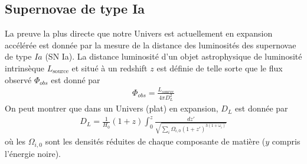 \documentclass[a4paper,12pt]{report}
\theoremstyle{plain}
\theoremstyle{plain}
\begin{document}
% 

\subsection{Supernovae de type Ia}
La preuve la plus directe que notre Univers est actuellement en expansion acc\'el\'er\'ee
est donn\'ee par la mesure de la distance des luminosit\'es des supernovae de type $Ia$ (SN Ia). La
distance luminosit\'e d'un objet astrophysique de luminosit\'e intrins\`eque $L_{\text{source}}$ et situ\'e \`a
un redshift $z$ est d\'efinie de telle sorte que le flux observ\'e $ \Phi_{obs}$ est donn\'e par
\begin{eqnarray}
 \Phi_{obs} = \frac{L_{source}}{ 4 \pi D_L^2} \label{gene28}
\end{eqnarray}
On peut montrer \cite{267} que dans un Univers (plat) en expansion, $D_L$ est donn\'ee par
\begin{eqnarray}
 D_L = \frac{1}{H_0} (1 + z) \int_0^z \frac{dz'}{\sqrt{ \sum_{i}  \Omega_{i,0}(1+z')^{3(1 + \omega_i) }}} \label{gene29}
\end{eqnarray}
o\`u les $ \Omega_{i,0} $ sont les densit\'es r\'eduites de chaque composante de mati\`ere ($y$ compris l'\'energie
noire).
\end{document}
